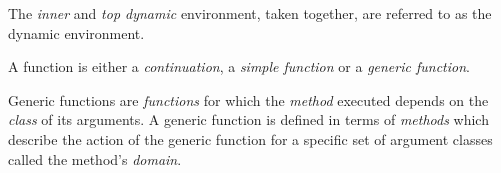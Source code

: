 \begin{optDefinition}
\begin{definitions}
     The
    {\em inner} and {\em top dynamic} environment, taken together, are referred
    to as the dynamic environment.


     A function is either a {\em
        continuation}, a {\em simple function} or a {\em generic function}.

      Generic
    functions are {\em functions} for which the {\em method} executed depends on
    the {\em class} of its arguments.  A generic function is defined in terms of
    {\em methods} which describe the action of the generic function for a
    specific set of argument classes called the method's {\em domain}.



\end{definitions}
\end{optDefinition}
